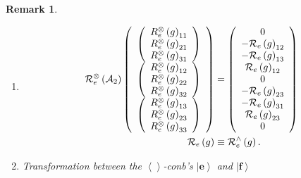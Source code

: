 \documentclass[aps,preprint]{revtex4}%
\newtheorem{remark}[theorem]{Remark}
\begin{document}
\begin{remark}
\begin{enumerate}
\item
\begin{align}
\mathcal{R}_{e}^{\otimes}\left(  \mathcal{A}_{2}\right)  \left(
\begin{array}
[c]{c}%
\left(
\begin{array}
[c]{c}%
{\small R}_{e}^{{\tiny \otimes}}\left(  {\small g}\right)  _{11}\\
{\small R}_{e}^{{\tiny \otimes}}\left(  g\right)  _{21}\\
{\small R}_{e}^{{\tiny \otimes}}\left(  g\right)  _{31}%
\end{array}
\right) \\
\left(
\begin{array}
[c]{c}%
{\small R}_{e}^{{\tiny \otimes}}\left(  g\right)  _{12}\\
{\small R}_{e}^{{\tiny \otimes}}\left(  g\right)  _{22}\\
{\small R}_{e}^{{\tiny \otimes}}\left(  g\right)  _{32}%
\end{array}
\right) \\
\left(
\begin{array}
[c]{c}%
{\small R}_{e}^{{\tiny \otimes}}\left(  g\right)  _{13}\\
{\small R}_{e}^{{\tiny \otimes}}\left(  g\right)  _{23}\\
{\small R}_{e}^{{\tiny \otimes}}\left(  g\right)  _{33}%
\end{array}
\right)
\end{array}
\right)   &  =\left(
\begin{array}
[c]{c}%
0\\
-\mathcal{R}_{e}\left(  g\right)  _{12}\\
-\mathcal{R}_{e}\left(  g\right)  _{13}\\
\mathcal{R}_{e}\left(  g\right)  _{12}\\
0\\
-\mathcal{R}_{e}\left(  g\right)  _{23}\\
-\mathcal{R}_{e}\left(  g\right)  _{31}\\
\mathcal{R}_{e}\left(  g\right)  _{23}\\
0
\end{array}
\right) \\
\mathcal{R}_{e}\left(  g\right)   &  \equiv\mathcal{R}_{e}^{\wedge}\left(
g\right)  .
\end{align}


\item Transformation between the $\left\langle {}\right\rangle $-conb's
$\left\vert \mathbf{e}\right\rangle $ and $\left\vert \mathbf{f}\right\rangle
$


\end{enumerate}
\end{remark}
\end{document}
